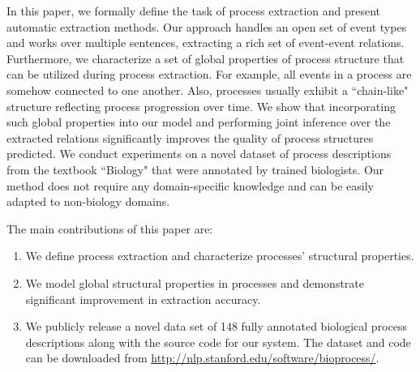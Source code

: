 
In this paper, we formally define the task of process extraction and present automatic extraction methods. 
Our approach handles an open set of event types and works over multiple sentences, extracting a rich set of event-event relations.
Furthermore, we characterize a set of global properties of process structure that can be utilized during process extraction. 
For example, all events in a process are somehow connected to one another. Also, processes usually exhibit a ``chain-like" structure reflecting process progression over time. 
We show that incorporating such global properties into our model and performing joint inference over the extracted relations significantly improves the quality of process structures predicted.  
We conduct experiments on a novel dataset of process descriptions from the textbook ``Biology" \cite{CampbellReece} that were annotated by trained biologists. Our method does not require any domain-specific knowledge and can be easily adapted to non-biology domains.

The main contributions of this paper are:
\begin{enumerate} [itemsep=0pt] 
\item We define process extraction and characterize processes' structural properties.
\item We model global structural properties in processes and demonstrate significant improvement in extraction accuracy.
\item We publicly release a novel data set of 148 fully annotated biological process descriptions along with the source code for our system. The dataset and code can be downloaded from \small{\url{http://nlp.stanford.edu/software/bioprocess/}}.
\end{enumerate}
